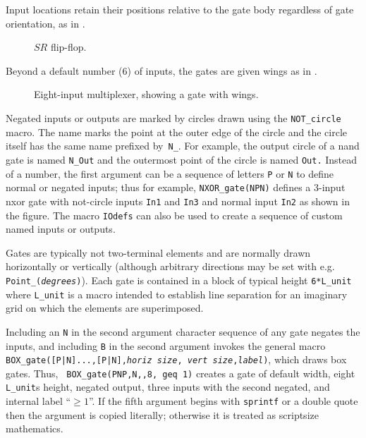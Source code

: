 Input locations retain their positions relative to the gate body
regardless of gate orientation, as in .
\begin{figure}[ht]
   \vspace*{-\baselineskip}
   \parbox{4.75in}{\small }%
   
   \vspace*{-\baselineskip}
   \caption{$SR$ flip-flop.}
   \label{FF}
   \end{figure}
Beyond a default number (6) of inputs, the
gates are given wings as in .
\begin{figure}[h!t]
   
   \vspace*{-0.5\baselineskip}
   \caption{Eight-input multiplexer, showing a gate with wings.}
   \label{exVIII}
   \end{figure}

Negated inputs or outputs are marked by circles drawn using the
\verb|NOT_circle| macro.  The name marks the point at the outer edge of the
circle and the circle itself has the same name prefixed by~{\tt N\_}.
For example, the output circle of a nand gate is named
{\tt N\_Out} and the outermost point of the circle is named {\tt Out.}
Instead of a number, the first argument can be a sequence of letters {\tt P}
or {\tt N} to define normal or negated inputs; thus for example,
{\tt NXOR\_gate(NPN)} defines a 3-input nxor gate with not-circle
inputs {\tt In1} and {\tt In3} and normal input {\tt In2}
as shown in the figure.
The macro {\tt IOdefs} can also be used to create a sequence of custom
named inputs or outputs.

Gates are typically not two-terminal elements and are normally drawn
horizontally or vertically (although arbitrary directions may be set
with e.g. {\tt Point\_({\sl degrees})}).
Each gate is contained in a
block of typical height {\tt 6*L\_unit} where {\tt L\_unit} is a macro
intended to establish line separation for an imaginary grid on which
the elements are superimposed.

Including an \verb|N| in the second
argument character sequence of any gate negates the inputs, and including
\verb|B| in the second argument invokes the
general macro {\tt BOX\_gate([P|N]...,[P|N],{\sl horiz size},{\sl
vert size},{\sl label})}, which draws box gates.  Thus, {\tt
BOX\_gate(PNP,N,,8, geq 1)} creates a gate of default width,
eight {\tt L\_unit}s height, negated output, three inputs with the
second negated, and internal label ``$\geq1$''.
If the fifth argument begins with {\tt sprintf} or a double quote then
the argument is copied literally; otherwise it is treated as scriptsize
mathematics.

